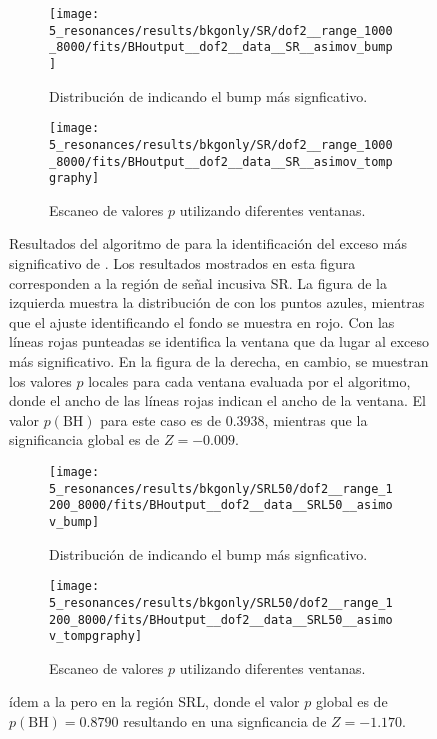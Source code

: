 \begin{figure}[ht!]
    \centering
    \begin{subfigure}[t]{0.49\linewidth}
        \centering
        \texttt{[image: 5\_resonances/results/bkgonly/SR/dof2\_\_range\_1000\_8000/fits/BHoutput\_\_dof2\_\_data\_\_SR\_\_asimov\_bump]}
        \caption{Distribución de \myj indicando el bump más signficativo.}
    \end{subfigure}
    \hfill
    \begin{subfigure}[t]{0.49\linewidth}
        \centering
        \texttt{[image: 5\_resonances/results/bkgonly/SR/dof2\_\_range\_1000\_8000/fits/BHoutput\_\_dof2\_\_data\_\_SR\_\_asimov\_tompgraphy]}
        \caption{Escaneo de valores \(p\) utilizando diferentes ventanas.}
    \end{subfigure}
    \caption{Resultados del algoritmo de \bh para la identificación del exceso más significativo de \myj. Los resultados mostrados en esta figura corresponden a la región de señal incusiva SR. La figura de la izquierda muestra la distribución de \myj con los puntos azules, mientras que el ajuste identificando el fondo se muestra en rojo. Con las líneas rojas punteadas se identifica la ventana que da lugar al exceso más significativo. En la figura de la derecha, en cambio, se muestran los valores \(p\) locales para cada ventana evaluada por el algoritmo, donde el ancho de las líneas rojas indican el ancho de la ventana. El valor \(p \left(\text{BH}\right)\) para este caso es de \(0.3938\), mientras que la significancia global es de \(Z = -0.009\).}
    \label{fig:results:results:bkgonly:bh:SR}
\end{figure}

\begin{figure}[ht!]
    \centering
    \begin{subfigure}[t]{0.49\linewidth}
        \centering
        \texttt{[image: 5\_resonances/results/bkgonly/SRL50/dof2\_\_range\_1200\_8000/fits/BHoutput\_\_dof2\_\_data\_\_SRL50\_\_asimov\_bump]}
        \caption{Distribución de \myj indicando el bump más signficativo.}
    \end{subfigure}
    \hfill
    \begin{subfigure}[t]{0.49\linewidth}
        \centering
        \texttt{[image: 5\_resonances/results/bkgonly/SRL50/dof2\_\_range\_1200\_8000/fits/BHoutput\_\_dof2\_\_data\_\_SRL50\_\_asimov\_tompgraphy]}
        \caption{Escaneo de valores \(p\) utilizando diferentes ventanas.}
    \end{subfigure}
    \caption{ídem a la \Fig{\ref{fig:results:results:bkgonly:bh:SR}} pero en la región SRL, donde el valor \(p\) global es de \(p(\text{BH}) = 0.8790\) resultando en una signficancia de \(Z=-1.170\).}
    \label{fig:results:results:bkgonly:bh:SRL}
\end{figure}

